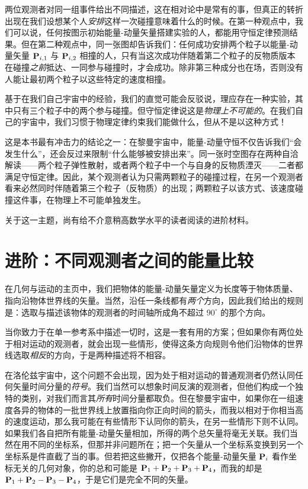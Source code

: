两位观测者对同一组事件给出不同描述，这在相对论中是常有的事，但真正的转折出现在我们设想某个人\emph{安排}这样一次碰撞意味着什么的时候。在第一种观点中，我们可以说，任何按图示初始能量-动量矢量搭建实验的人，都能用守恒定律预测结果。但在第二种观点中，同一张图却告诉我们：任何成功安排两个粒子以能量-动量矢量 $\mathbf{P}_{i,1}$ 与 $\mathbf{P}_{i,2}$ 相撞的人，只有当这次成功伴随着第二个粒子的反物质版本在碰撞\emph{之前}抵达、一同参与碰撞时，才会成功。除非第三种成分也在场，否则没有人能让最初两个粒子以这些特定的速度相撞。

基于在我们自己宇宙中的经验，我们的直觉可能会反驳说，理应存在一种实验，其中只有三个粒子中的两个参与碰撞。但守恒定律说这是\emph{物理上不可能的}。在我们自己的宇宙中，我们习惯于物理定律约束我们能做什么，但从不是以这种方式！

\begin{keybox}[本节的结论]
这是本书最有冲击力的结论之一：在黎曼宇宙中，能量-动量守恒不仅告诉我们“会发生什么”，还会反过来限制“什么能够被安排出来”。同一张时空图存在两种自洽解读——两个粒子弹性散射，或者两个粒子中一个与自身的反物质湮灭——二者都满足守恒定律。因此，某个观测者认为只需两颗粒子的碰撞过程，在另一个观测者看来必然同时伴随着第三个粒子（反物质）的出现；两颗粒子以该方式、该速度碰撞这件事，在物理上不可能单独发生。
\end{keybox}

关于这一主题，尚有给不介意稍高数学水平的读者阅读的进阶材料。

\section{进阶：不同观测者之间的能量比较}

在几何与运动的主页中，我们把物体的能量-动量矢量定义为长度等于物体质量、指向沿物体世界线的矢量。当然，沿任一条线都有\emph{两个}方向，因此我们给出的规则是：选取与描述该物体的观测者的时间轴所成角不超过 $90^\circ$ 的那个方向。

当你致力于在单一参考系中描述一切时，这是一套有用的方案；但如果你有两位处于相对运动的观测者，就会出现一些情形，使得这条方向规则令他们沿物体的世界线选取\emph{相反}的方向，于是两种描述将不相容。

在洛伦兹宇宙中，这个问题不会出现，因为处于相对运动的普通观测者仍然认同任何矢量时间分量的\emph{符号}。我们当然可以想象时间反演的观测者，但他们构成一个独特的类别，对我们而言其\emph{所有}时间分量都取负。但在黎曼宇宙中，如果你在一组速度各异的物体的一批世界线上放置指向你正向时间的箭头，而我以相对于你相当高的速度运动，那么我可能在有些情形下认同你的箭头，在另一些情形下则不认同。如果我们各自把所有能量-动量矢量相加，所得的两个总矢量将毫无关联。我们当然在用不同的坐标系，但那并非问题所在；把一个矢量从一个坐标系变换到另一个坐标系是件直截了当的事。但若把这些撇开，仅把各个能量-动量矢量 $\mathbf{P}_{i}$ 看作坐标无关的几何对象，你的总和可能是 $\mathbf{P}_{1}+\mathbf{P}_{2}+\mathbf{P}_{3}+\mathbf{P}_{4}$，而我的却是 $\mathbf{P}_{1}+\mathbf{P}_{2}-\mathbf{P}_{3}-\mathbf{P}_{4}$，于是它们是完全不同的矢量。

